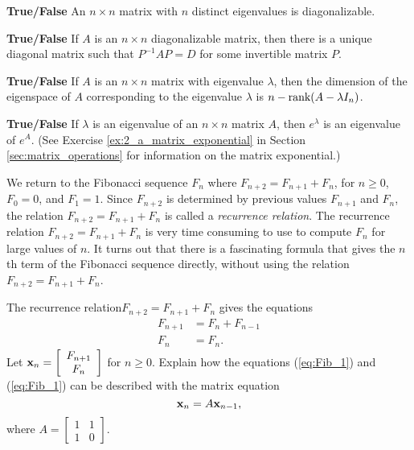 \item \textbf{True/False} An $n\times n$ matrix with $n$ distinct eigenvalues is diagonalizable.

\item \textbf{True/False} If $A$ is an $n\times n$ diagonalizable matrix, then there is a unique diagonal matrix such that $P^{-1}AP = D$ for some invertible matrix $P$.  

\item \textbf{True/False} If $A$ is an $n\times n$ matrix with eigenvalue $\lambda$, then the dimension of the eigenspace of $A$ corresponding to the eigenvalue $\lambda$ is $n - \text{rank}(A - \lambda I_n)$. 

\item \textbf{True/False} If $\lambda$ is an eigenvalue of an $n \times n$ matrix $A$, then $e^\lambda$ is an eigenvalue of $e^A$. (See Exercise  \ref{ex:2_a_matrix_exponential} in Section \ref{sec:matrix_operations} for information on the matrix exponential.)

\ea
\ee

\label{sec:proj_binet_fibo}

We return to the Fibonacci sequence $F_n$ where $F_{n+2} = F_{n+1} + F_{n}$, for $n \geq 0$, $F_0 = 0$, and $F_1=1$. Since $F_{n+2}$ is determined by previous values $F_{n+1}$ and $F_n$, the relation $F_{n+2} = F_{n+1} + F_{n}$ is called a \emph{recurrence relation}. The recurrence relation $F_{n+2} = F_{n+1} + F_{n}$ is very time consuming to use to compute $F_n$ for large values of $n$. It turns out that there is a fascinating formula that gives the $n$th term of the Fibonacci sequence directly, without using the relation $F_{n+2} = F_{n+1} + F_{n}$.


\begin{pactivity} The recurrence relation$F_{n+2} = F_{n+1} + F_{n}$ gives the equations
\begin{align}
F_{n+1} &= F_{n} + F_{n-1} \label{eq:Fib_1} \\
F_{n} &= F_{n}. \label{eq:Fib_2} 
\end{align} 
Let $\mathbf{x}_{n} = \left[ \begin{array}{c} F_{n+1} \\ F_{n} \end{array} \right]$ for $n \geq 0$. Explain how the equations (\ref{eq:Fib_1}) and (\ref{eq:Fib_1}) can be described with the matrix equation
\begin{equation} \label{eq:Fib_matrix}
\mathbf{x}_n = A \mathbf{x}_{n-1},
\end{equation}
where $A = \left[ \begin{array}{cc} 1&1 \\ 1&0 \end{array} \right]$. 

\end{pactivity}



